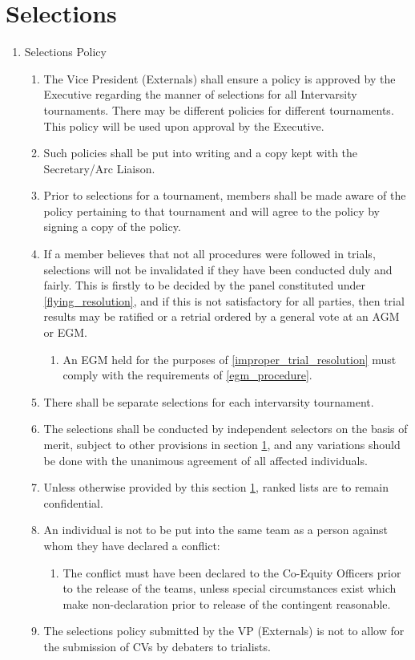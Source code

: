 \newpage
\section{Selections} \label{selections_section}

\begin{enumerate}
\item Selections Policy
  \begin{enumerate}
  \item The Vice President (Externals) shall ensure a policy is approved by the Executive regarding the manner of selections for all Intervarsity tournaments. There may be different policies for different tournaments. This policy will be used upon approval by the Executive.
  \item Such policies shall be put into writing and a copy kept with the Secretary/Arc Liaison.
  \item Prior to selections for a tournament, members shall be made aware of the policy pertaining to that tournament and will agree to the policy by signing a copy of the policy.
  \item If a member believes that not all procedures were followed in trials, selections will not be invalidated if they have been conducted duly and fairly. This is firstly to be decided by the panel constituted under \ref{flying_resolution}, and if this is not satisfactory for all parties, then trial results may be ratified or a retrial ordered by a general vote at an AGM or EGM. \label{improper_trial_resolution}
    \begin{enumerate}
    \item An EGM held for the purposes of \ref{improper_trial_resolution} must comply with the requirements of \ref{egm_procedure}.
    \end{enumerate}
  \item There shall be separate selections for each intervarsity tournament.
  \item The selections shall be conducted by independent selectors on the basis of merit, subject to other provisions in section \ref{selections_section}, and any variations should be done with the unanimous agreement of all affected individuals.
  \item Unless otherwise provided by this section \ref{selections_section}, ranked lists are to remain confidential.
  \item An individual is not to be put into the same team as a person against whom they have declared a conflict:
    \begin{enumerate}
    \item The conflict must have been declared to the Co-Equity Officers prior to the release of the teams, unless special circumstances exist which make non-declaration prior to release of the contingent reasonable.
    \end{enumerate}
  \item The selections policy submitted by the VP (Externals) is not to allow for the submission of CVs by debaters to trialists.
  \end{enumerate}


\end{enumerate}
